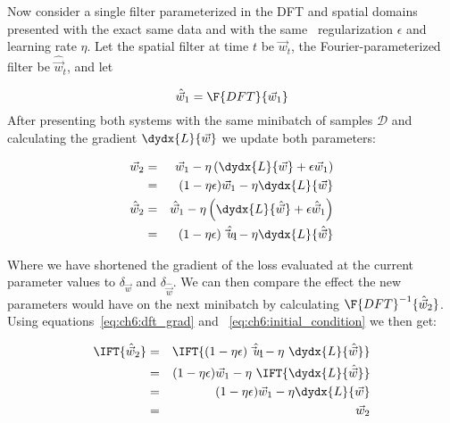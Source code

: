 Now consider a single filter parameterized in the DFT and spatial domains
presented with the exact same data and with the same \ltwo\ regularization
$\epsilon$ and learning rate $\eta$. Let
the spatial filter at time $t$ be $\vec{w}_t$, the Fourier-parameterized
filter be $\hat{\vec{w}}_t$, and let 

\begin{equation}
  \hat{\vec{w}}_1 = \F{DFT}\{\vec{w}_1\} \label{eq:ch6:initial_condition}
\end{equation}
%
After presenting both systems with the same minibatch of samples $\mathcal{D}$
and calculating the gradient $\dydx{L}{\vec{w}}$ we update both parameters:

\begin{eqnarray}
  \vec{w}_2 & = & \vec{w}_1 - \eta \left(
    \dydx{L}{\vec{w}} + \epsilon \vec{w}_1 \right) \\
    &=& (1-\eta\epsilon)\vec{w}_1 - \eta \dydx{L}{\vec{w}} \\
  \hat{\vec{w}}_2 & = & \hat{\vec{w}}_1 - \eta \left(
     \dydx{L}{\hat{\vec{w}}} + \epsilon \hat{\vec{w}}_1 \right)  \\
     &=& (1-\eta\epsilon)\hat{\vec{w}_1} - \eta \dydx{L}{\hat{\vec{w}}} \\
\end{eqnarray}

Where we have shortened the gradient of the loss evaluated at the current
parameter values to $\delta_{\vec{w}}$ and $\delta_{\hat{\vec{w}}}$.
We can then compare the effect the new parameters would have on the next
minibatch by calculating $\F{DFT}^{-1} \{\hat{\vec{w}}_2 \}$. Using
equations~\ref{eq:ch6:dft_grad} and ~\ref{eq:ch6:initial_condition} we then get:

\begin{eqnarray}
  \IFT{\hat{\vec{w}}_2} &=& \IFT{(1-\eta\epsilon)\hat{\vec{w}_1} - \eta\ \dydx{L}{\hat{\vec{w}}}} \\       
                        & = & (1-\eta\epsilon)\vec{w}_1 - \eta\ \IFT{ \dydx{L}{\hat{\vec{w}}}} \\
                        & = & (1-\eta\epsilon)\vec{w}_1 - \eta \dydx{L}{\vec{w}} \\
                        & = & \vec{w}_2
\end{eqnarray}

